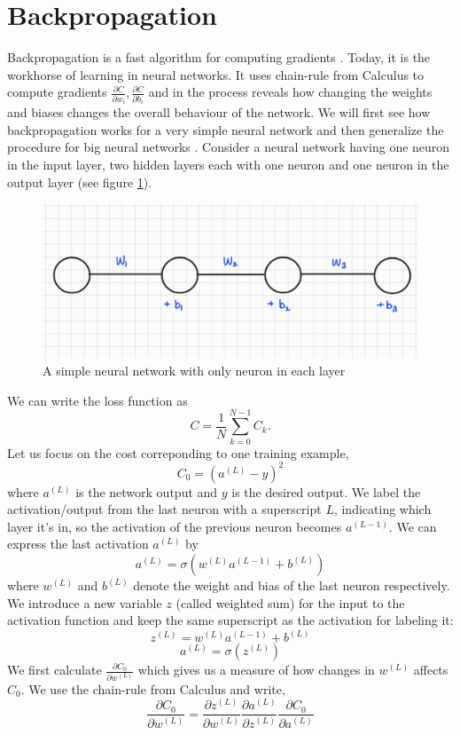 \section{Backpropagation}
Backpropagation is a fast algorithm for computing gradients \cite{nielsen2015neural}. Today, it is the workhorse of learning in neural networks. It uses chain-rule from 
Calculus to compute gradients $\frac{\partial C}{\partial w_i}, \frac{\partial C}{\partial b_i}$ and in the process reveals how changing the weights and 
biases changes the overall behaviour of the network. We will first see how backpropagation works for a very simple neural network and then generalize the procedure for
big neural networks \cite{backprop_grant}. Consider a neural network having one neuron in the input layer, two hidden layers each with one neuron and one neuron in the output layer (see figure \ref{fig:sim_NN}). 
\begin{figure}[htbp]
    \centering
    \includegraphics[width=.5\textwidth]{Figures/simpNN.png}
    \caption{A simple neural network with only neuron in each layer}
    \label{fig:sim_NN}
\end{figure} 
We can write the loss function as 
$$C = \frac{1}{N} \sum_{k=0}^{N-1} C_k.$$
Let us focus on the cost correponding to one training example,
$$C_0 = (a^{(L)} - y)^2$$ 
where $a^{(L)}$ is the network output and $y$ is the desired output. We label the activation/output from the last neuron with a superscript $L$, indicating which layer it's in, so the
activation of the previous neuron becomes $a^{(L-1)}$. We can express the last activation $a^{(L)}$ by 
$$a^{(L)} = \sigma (w^{(L)}a^{(L-1)} + b^{(L)})$$
where $w^{(L)}$ and $b^{(L)}$ denote the weight and bias of the last neuron respectively. We introduce a new variable $z$ (called weighted sum) for the input to the activation function and keep the same superscript as the activation for labeling it:
$$z^{(L)} = w^{(L)} a^{(L-1)} + b^{(L)}$$
$$a^{(L)} = \sigma (z^{(L)}) $$
We first calculate $\frac{\partial C_0}{\partial w^{(L)}}$ which gives us a measure of how changes in $w^{(L)}$ affects $C_0$. We use the chain-rule from Calculus and write, 
\begin{equation}
    \label{eq:sim_grad_w}
    \frac{\partial C_0}{\partial w^{(L)}} = \frac{\partial z^{(L)}}{\partial w^{(L)}} \frac{\partial a^{(L)}}{\partial z^{(L)}} \frac{\partial C_0}{\partial a^{(L)}}
\end{equation}
